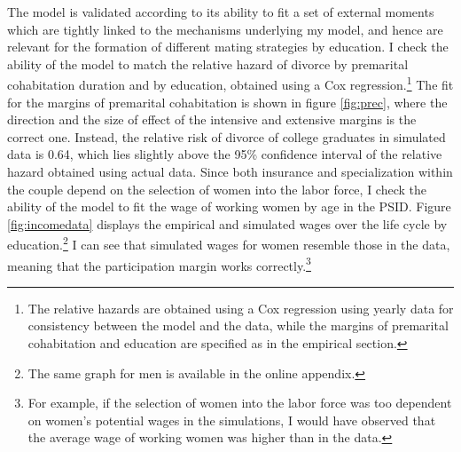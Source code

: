 \documentclass[12pt]{article}
\begin{document}
 The model is validated according to its ability to fit a set of external moments which are tightly linked to the mechanisms underlying my model, and hence are relevant for the formation of different mating strategies by education. I check the ability of the model to match the relative hazard of divorce by premarital cohabitation duration and by education, obtained using a Cox regression.\footnote{The relative hazards are obtained using a Cox regression using yearly data for consistency between the model and the data, while the margins of premarital cohabitation and education are specified as in the empirical section.} The fit for the margins of premarital cohabitation is shown in figure \ref{fig:prec}, where the direction and the size of effect of the intensive and extensive margins is the correct one. Instead, the relative risk of divorce of college graduates in simulated data is 0.64, which lies slightly above the 95\% confidence interval of the relative hazard obtained using actual data. Since both insurance and specialization within the couple depend on the selection of women into the labor force, I check the ability of the model to fit the wage of working women by age in the PSID. Figure \ref{fig:incomedata} displays the empirical and simulated wages over the life cycle by education.\footnote{The same graph for men is available in the online appendix.} I can see that simulated wages for women resemble those in the data, meaning that the participation margin works correctly.\footnote{For example, if the selection of women into the labor force was too dependent on women's potential wages in the simulations, I would have observed that the average wage of working women was higher than in the data.}
\end{document}
